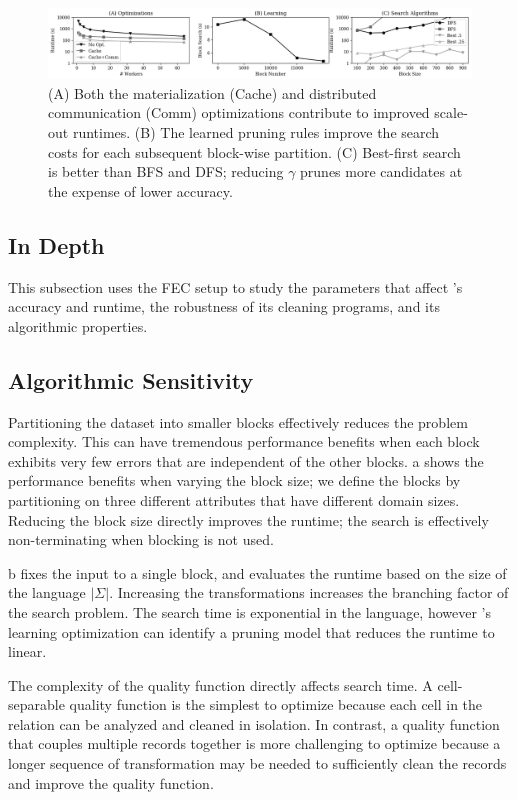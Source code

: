  \begin{figure}[t]
\centering
 \includegraphics[width=\textwidth]{ac-experiments/exp6.png}
 \caption{\small 
   (A) Both the materialization (Cache) and distributed communication (Comm) optimizations contribute to improved scale-out runtimes.
   (B) The learned pruning rules improve the search costs for each subsequent block-wise partition.  
   (C) Best-first search is better than BFS and DFS; reducing $\gamma$ prunes more candidates at the expense of lower accuracy.  
 \label{fig:opt}}
\end{figure}


\subsection*{\sys In Depth}
This subsection uses the FEC setup to study the parameters that affect \sys's accuracy and runtime, the robustness of its cleaning programs, and its algorithmic properties.

\subsection*{Algorithmic Sensitivity}

 Partitioning the dataset into smaller blocks effectively reduces the problem complexity.  This can have tremendous performance benefits when each block exhibits very few errors that are independent of the other blocks.  a shows the performance benefits when varying the block size; we define the blocks by partitioning on three different attributes that have different domain sizes.  Reducing the block size directly improves the runtime; the search is effectively non-terminating when blocking is not used.    

 b fixes the input to a single block, and evaluates the runtime based on the size of the language $|\Sigma|$.  Increasing the transformations increases the branching factor of the search problem. The search time is exponential in the language, however \sys's learning optimization can identify a pruning model that reduces the runtime to linear.

 The complexity of the quality function directly affects search time.  A cell-separable quality function is the simplest to optimize because each cell in the relation can be analyzed and cleaned in isolation.  In contrast, a quality function that couples multiple records together is more challenging to optimize because a longer sequence of transformation may be needed to sufficiently clean the records and improve the quality function.  

